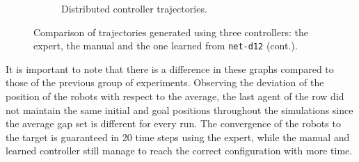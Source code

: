 \begin{figure}[!htb]
\begin{center}
\begin{subfigure}[h]{0.49\textwidth}
			\caption{Distributed controller trajectories.}
		\end{subfigure}
	\end{center}
	\vspace{-0.5cm}
	\caption[Evaluation of the trajectories learned by 
	\texttt{net-d12}.]{Comparison of trajectories generated using three controllers: 
		the expert, the manual and the one learned from \texttt{net-d12} (cont.).}
	\label{fig:net-d12traj}
\end{figure}
It is important to note that there is a difference in these graphs compared to 
those of the previous group of experiments. Observing the deviation of the 
position of the robots with respect to the average, the last agent of the row did 
not maintain the same initial and goal positions throughout the simulations since 
the average gap set is different for every run.
The convergence of the robots to the target is guaranteed in 20 time steps using 
the expert, while the manual and learned controller still manage to reach the 
correct configuration with more time.

